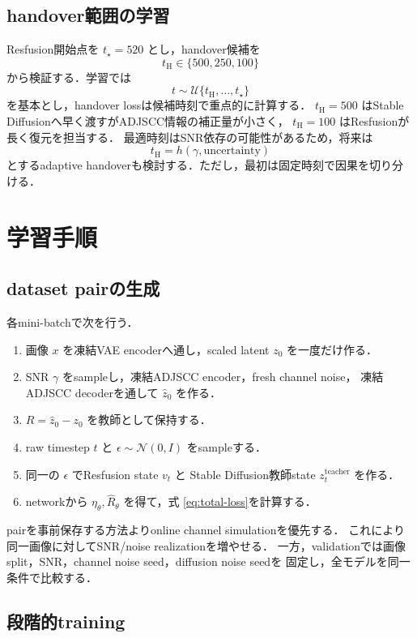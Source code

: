 \documentclass[11pt,a4paper]{ltjsarticle}
\newcommand{\N}{\mathcal{N}}
\begin{document}
\subsection{handover範囲の学習}

Resfusion開始点を \(t_\star=520\) とし，handover候補を
\[
  t_{\mathrm H}\in\{500,250,100\}
\]
から検証する．学習では
\[
  t\sim\mathcal U\{t_{\mathrm H},\ldots,t_\star\}
\]
を基本とし，handover lossは候補時刻で重点的に計算する．
\(t_{\mathrm H}=500\) はStable Diffusionへ早く渡すがADJSCC情報の補正量が小さく，
\(t_{\mathrm H}=100\) はResfusionが長く復元を担当する．
最適時刻はSNR依存の可能性があるため，将来は
\[
  t_{\mathrm H}=h(\gamma,\text{uncertainty})
\]
とするadaptive handoverも検討する．ただし，最初は固定時刻で因果を切り分ける．

\section{学習手順}

\subsection{dataset pairの生成}

各mini-batchで次を行う．
\begin{enumerate}
  \item 画像 \(x\) を凍結VAE encoderへ通し，scaled latent \(z_0\) を一度だけ作る．
  \item SNR \(\gamma\) をsampleし，凍結ADJSCC encoder，fresh channel noise，
        凍結ADJSCC decoderを通して \(\hat z_0\) を作る．
  \item \(R=\hat z_0-z_0\) を教師として保持する．
  \item raw timestep \(t\) と \(\epsilon\sim\N(0,I)\) をsampleする．
  \item 同一の \(\epsilon\) でResfusion state \(v_t\) と
        Stable Diffusion教師state \(z_t^{\mathrm{teacher}}\) を作る．
  \item networkから \(\eta_\theta,\hat R_\theta\) を得て，式
        \eqref{eq:total-loss}を計算する．
\end{enumerate}
pairを事前保存する方法よりonline channel simulationを優先する．
これにより同一画像に対してSNR/noise realizationを増やせる．
一方，validationでは画像split，SNR，channel noise seed，diffusion noise seedを
固定し，全モデルを同一条件で比較する．

\subsection{段階的training}
\end{document}
